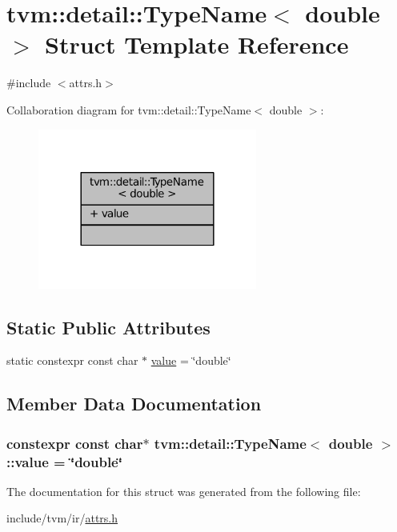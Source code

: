 \hypertarget{structtvm_1_1detail_1_1TypeName_3_01double_01_4}{}\section{tvm\+:\+:detail\+:\+:Type\+Name$<$ double $>$ Struct Template Reference}
\label{structtvm_1_1detail_1_1TypeName_3_01double_01_4}


{\ttfamily \#include $<$attrs.\+h$>$}



Collaboration diagram for tvm\+:\+:detail\+:\+:Type\+Name$<$ double $>$\+:
\nopagebreak
\begin{figure}[H]
\begin{center}
\leavevmode
\includegraphics[width=204pt]{structtvm_1_1detail_1_1TypeName_3_01double_01_4__coll__graph}
\end{center}
\end{figure}
\subsection*{Static Public Attributes}
\begin{DoxyCompactItemize}
\item 
static constexpr const char $\ast$ \hyperlink{structtvm_1_1detail_1_1TypeName_3_01double_01_4_abd511d0b0bf46cf6fe251eea8c20c386}{value} = \char`\"{}double\char`\"{}
\end{DoxyCompactItemize}


\subsection{Member Data Documentation}
\subsubsection[{\texorpdfstring{value}{value}}]{\setlength{\rightskip}{0pt plus 5cm}constexpr const char$\ast$ {\bf tvm\+::detail\+::\+Type\+Name}$<$ double $>$\+::value = \char`\"{}double\char`\"{}\hspace{0.3cm}{\ttfamily [static]}}\hypertarget{structtvm_1_1detail_1_1TypeName_3_01double_01_4_abd511d0b0bf46cf6fe251eea8c20c386}{}\label{structtvm_1_1detail_1_1TypeName_3_01double_01_4_abd511d0b0bf46cf6fe251eea8c20c386}


The documentation for this struct was generated from the following file\+:\begin{DoxyCompactItemize}
\item 
include/tvm/ir/\hyperlink{ir_2attrs_8h}{attrs.\+h}\end{DoxyCompactItemize}
